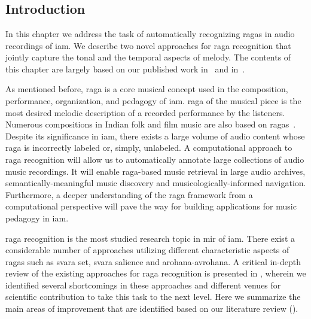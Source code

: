 
\chapter{}
\label{chap:raga_recognition}




\section{Introduction}

In this chapter we address the task of automatically recognizing \glspl{raga} in audio recordings of \gls{iam}. We describe two novel approaches for \gls{raga} recognition that jointly capture the tonal and the temporal aspects of melody. The contents of this chapter are largely based on our published work in~\cite{gulatiphrase_2016} and in~\cite{gulati_tdms_2016}.

As mentioned before, \gls{raga} is a core musical concept used in the composition, performance, organization, and pedagogy of \gls{iam}. \Gls{raga} of the musical piece is the most desired melodic description of a recorded performance by the listeners. Numerous compositions in Indian folk and film music are also based on \glspl{raga}~\citep{ganti2013bollywood}. Despite its significance in \gls{iam}, there exists a large volume of audio content whose \gls{raga} is incorrectly labeled or, simply, unlabeled. A computational approach to \gls{raga} recognition will allow us to automatically annotate large collections of audio music recordings. It will enable \gls{raga}-based music retrieval in large audio archives, semantically-meaningful music discovery and musicologically-informed navigation. Furthermore, a deeper understanding of the \gls{raga} framework from a computational perspective will pave the way for building applications for music pedagogy in \gls{iam}. 

\Gls{raga} recognition is the most studied research topic in \gls{mir} of \gls{iam}. There exist a considerable number of approaches utilizing different characteristic aspects of \glspl{raga} such as \gls{svara} set, \gls{svara} salience and \gls{arohana}-\gls{avrohana}. A critical in-depth review of the existing approaches for \gls{raga} recognition is presented in , wherein we identified several shortcomings in these approaches and different venues for scientific contribution to take this task to the next level. Here we summarize the main areas of improvement that are identified based on our literature review (). 

